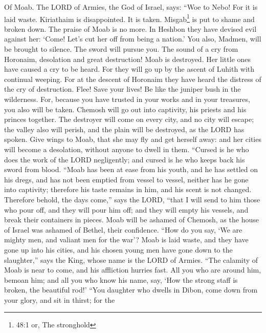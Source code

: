  Of Moab. The LORD of Armies, the God of Israel, says: ``Woe
to Nebo! For it is laid waste. Kiriathaim is disappointed. It is taken.
Misgab\footnote{48:1 or, The stronghold} is put to shame and broken
down.  The praise of Moab is no more. In Heshbon they have
devised evil against her: `Come! Let's cut her off from being a nation.'
You also, Madmen, will be brought to silence. The sword will pursue you.
 The sound of a cry from Horonaim, desolation and great
destruction!  Moab is destroyed. Her little ones have caused
a cry to be heard.  For they will go up by the ascent of
Luhith with continual weeping. For at the descent of Horonaim they have
heard the distress of the cry of destruction.  Flee! Save
your lives! Be like the juniper bush in the wilderness. 
For, because you have trusted in your works and in your treasures, you
also will be taken. Chemosh will go out into captivity, his priests and
his princes together.  The destroyer will come on every
city, and no city will escape; the valley also will perish, and the
plain will be destroyed, as the LORD has spoken.  Give wings
to Moab, that she may fly and get herself away: and her cities will
become a desolation, without anyone to dwell in them. 
``Cursed is he who does the work of the LORD negligently; and cursed is
he who keeps back his sword from blood.  ``Moab has been at
ease from his youth, and he has settled on his dregs, and has not been
emptied from vessel to vessel, neither has he gone into captivity;
therefore his taste remains in him, and his scent is not changed.
 Therefore behold, the days come,'' says the LORD, ``that I
will send to him those who pour off, and they will pour him off; and
they will empty his vessels, and break their containers in pieces.
 Moab will be ashamed of Chemosh, as the house of Israel
was ashamed of Bethel, their confidence.  ``How do you say,
`We are mighty men, and valiant men for the war'?  Moab is
laid waste, and they have gone up into his cities, and his chosen young
men have gone down to the slaughter,'' says the King, whose name is the
LORD of Armies.  ``The calamity of Moab is near to come,
and his affliction hurries fast.  All you who are around
him, bemoan him; and all you who know his name, say, `How the strong
staff is broken, the beautiful rod!'  ``You daughter who
dwells in Dibon, come down from your glory, and sit in thirst; for the
